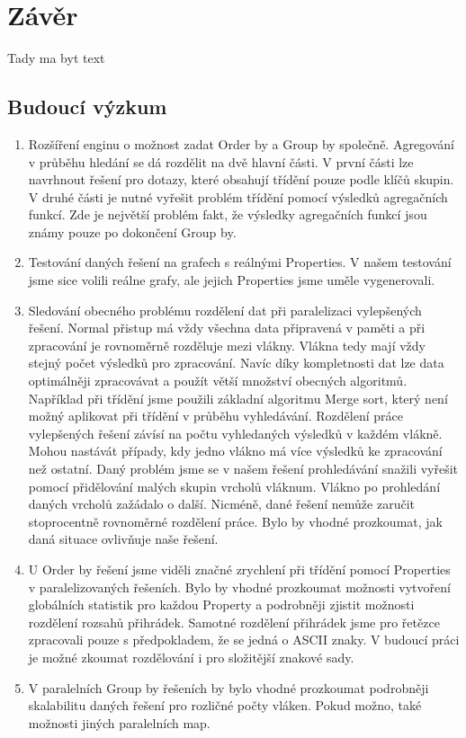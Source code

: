 \chapter{Závěr}

Tady ma byt text

\section{Budoucí výzkum}


\begin{enumerate}


\item Rozšíření enginu o možnost zadat Order by a Group by společně.
Agregování v průběhu hledání se dá rozdělit na dvě hlavní části.
V první části lze navrhnout řešení pro dotazy, které obsahují třídění pouze podle klíčů skupin.
V druhé části je nutné vyřešit problém třídění pomocí výsledků agregačních funkcí.
Zde je největší problém fakt, že výsledky agregačních funkcí jsou známy pouze po dokončení Group by.

\item Testování daných řešení na grafech s reálnými Properties.
V našem testování jsme sice volili reálne grafy, ale jejich Properties jsme uměle vygenerovali.

\item Sledování obecného problému rozdělení dat při paralelizaci vylepšených řešení. 
Normal přistup má vždy všechna data připravená v paměti a při zpracování je rovnoměrně rozděluje mezi vlákny.
Vlákna tedy mají vždy stejný počet výsledků pro zpracování.
Navíc díky kompletnosti dat lze data optimálněji zpracovávat a použít větší množství obecných algoritmů.
Například při třídění jsme použili základní algoritmu Merge sort, který není možný aplikovat při třídění v průběhu vyhledávání.  
Rozdělení práce vylepšených řešení závísí na počtu vyhledaných výsledků v každém vlákně.
Mohou nastávát případy, kdy jedno vlákno má více výsledků ke zpracování než ostatní. 
Daný problém jsme se v našem řešení prohledávání snažili vyřešit pomocí přidělování malých skupin vrcholů vláknum.
Vlákno po prohledání daných vrcholů zažádalo o další.
Nicméně, dané řešení nemůže zaručit stoprocentně rovnoměrné rozdělení práce.
Bylo by vhodné prozkoumat, jak daná situace ovlivňuje naše řešení.

\item U Order by řešení jsme viděli značné zrychlení při třídění pomocí Properties v paralelizovaných řešeních.
Bylo by vhodné prozkoumat možnosti vytvoření globálních statistik pro každou Property a podrobněji zjistit možnosti rozdělení rozsahů přihrádek.
Samotné rozdělení přihrádek jsme pro řetězce zpracovali pouze s předpokladem, že se jedná o ASCII znaky.
V budoucí práci je možné zkoumat rozdělování i pro složitější znakové sady.

\item V paralelních Group by řešeních by bylo vhodné prozkoumat podrobněji skalabilitu daných řešení pro rozličné počty vláken.
Pokud možno, také možnosti jiných paralelních map.
 
\end{enumerate}